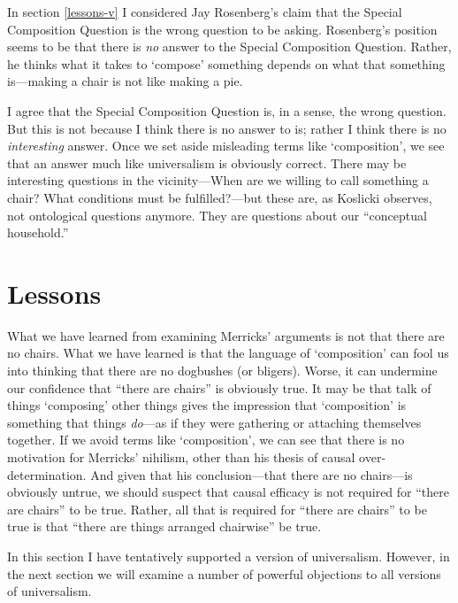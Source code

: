 \documentclass[11pt]{article}
\begin{document}
\begin{spacing}{1.25}
In section \ref{lessons-v} I considered Jay Rosenberg's claim that
the Special Composition Question is the wrong question to be asking.
Rosenberg's position seems to be that there is {\em no} answer to the
Special Composition Question.  Rather, he thinks what it takes to
`compose' something depends on what that something is---making a chair
is not like making a pie.

I agree that the Special Composition Question is, in a sense, the
wrong question.  But this is not because I think there is no answer to
is; rather I think there is no {\em interesting} answer.  Once we set
aside misleading terms like `composition', we see that an answer much
like universalism is obviously correct.  There may be interesting
questions in the vicinity---When are we willing to call something a
chair?  What conditions must be fulfilled?---but these are, as
Koslicki observes, not ontological questions anymore.  They are
questions about our ``conceptual household.''

\section{Lessons}
What we have learned from examining Merricks' arguments is not that
there are no chairs.  What we have learned is that the language of
`composition' can fool us into thinking that there are no dogbushes
(or bligers).  Worse, it can undermine our confidence that ``there are
chairs'' is obviously true.  It may be that talk of things `composing'
other things gives the impression that `composition' is something that
things {\em do}---as if they were gathering or attaching themselves
together.  If we avoid terms like `composition', we can see that there
is no motivation for Merricks' nihilism, other than his thesis of
causal over-determination.  And given that his conclusion---that there
are no chairs---is obviously untrue, we should suspect that causal
efficacy is not required for ``there are chairs'' to be true.  Rather,
all that is required for ``there are chairs'' to be true is that
``there are things arranged chairwise'' be true.

In this section I have tentatively supported a version of
universalism.  However, in the next section we will examine a number
of powerful objections to all versions of universalism.

\ifstandalone
\end{spacing}


\fi
\end{document}
